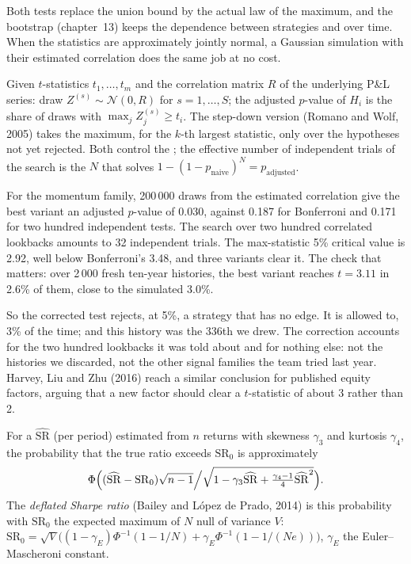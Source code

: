 Both tests replace the union bound by the actual law of the maximum, and the bootstrap (chapter~13) keeps the dependence between
strategies and over time. When the statistics are approximately jointly normal, a Gaussian simulation with their estimated
correlation does the same job at no cost.

\begin{method}\label{met:qm:testing-and-multiple-testing:maxt}
Given $t$-statistics $t_1, \dots, t_m$ and the correlation matrix $R$ of the underlying P\&L series: draw $Z^{(s)} \sim \mathcal N(0, R)$
for $s = 1, \dots, S$; the adjusted $p$-value of $H_i$ is the share of draws with $\max_j Z_j^{(s)} \ge t_i$. The step-down version
(Romano and Wolf, 2005) takes the maximum, for the $k$-th largest statistic, only over the hypotheses not yet rejected. Both
control the ; the effective number of independent trials of the search is the $N$ that solves $1 - (1 -
p_{\text{naive}})^N = p_{\text{adjusted}}$.
\end{method}

For the momentum family, 200\,000 draws from the estimated correlation give the best variant an adjusted $p$-value of 0.030,
against 0.187 for Bonferroni and 0.171 for two hundred independent tests. The search over two hundred correlated lookbacks amounts
to 32 independent trials. The max-statistic 5\% critical value is 2.92, well below Bonferroni's 3.48, and three variants clear it.
The check that matters: over 2\,000 fresh ten-year histories, the best variant reaches $t = 3.11$ in 2.6\% of them, close to the
simulated 3.0\%.

So the corrected test rejects, at 5\%, a strategy that has no edge. It is allowed to, 3\% of the time; and this history was
the 336th we drew. The correction accounts for the two hundred lookbacks it was told about and for nothing else: not the
histories we discarded, not the other signal families the team tried last year. Harvey, Liu and Zhu (2016) reach a similar
conclusion for published equity factors, arguing that a new factor should clear a $t$-statistic of about 3 rather than 2.

\begin{definition}\label{def:qm:testing-and-multiple-testing:dsr}
For a  $\widehat{\mathrm{SR}}$ (per period) estimated from $n$ returns with skewness $\gamma_3$ and kurtosis $\gamma_4$, the
probability that the true ratio exceeds $\mathrm{SR}_0$ is approximately
\[
\Phi\Bigl((\widehat{\mathrm{SR}} - \mathrm{SR}_0)\sqrt{n - 1}\Big/\sqrt{1 - \gamma_3\widehat{\mathrm{SR}} + \tfrac{\gamma_4 - 1}4\widehat{\mathrm{SR}}^2}\Bigr).
\]
The \emph{deflated Sharpe ratio} (Bailey and López de Prado, 2014) is this probability with $\mathrm{SR}_0$
the expected maximum of $N$ null  of variance $V$: $\mathrm{SR}_0 = \sqrt V\bigl((1 - \gamma_E)\Phi^{-1}(1 - 1/N) +
\gamma_E\Phi^{-1}(1 - 1/(Ne))\bigr)$, $\gamma_E$ the Euler--Mascheroni constant.
\end{definition}

